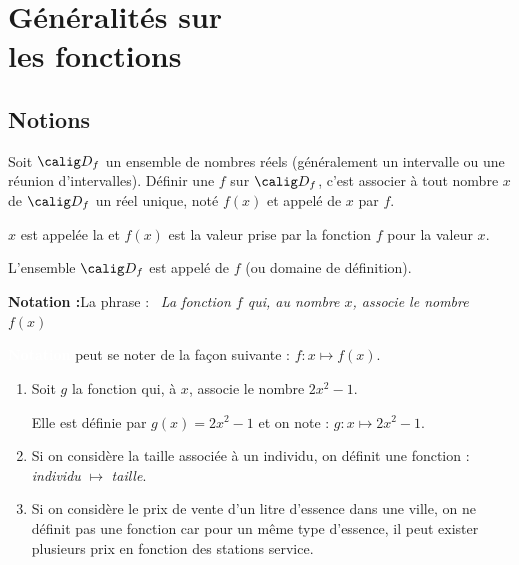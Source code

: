 \documentclass[10pt,openright,twoside,french]{book}
\begin{document}
\setcounter{chapter}{2}
\renewcommand\PartProgramme{Fonctions}
\chapter[Généralités sur les fonctions]{Généralités sur\\ les fonctions}\label{ch_gen_fonctions}

\section{Notions}

\begin{Defi}
    Soit $\calig D_f$ un ensemble de nombres réels (généralement un intervalle ou une réunion d'intervalles).
    Définir une  $f$ sur $\calig D_f$, c'est associer à tout nombre $x$ de $\calig D_f$ un réel unique, noté $f(x)$ et appelé  de $x$ par $f$.\par
    $x$ est appelée la  et $f(x)$ est la valeur prise par la fonction $f$ pour la valeur $x$.\par
    L'ensemble $\calig D_f$ est appelé  de $f$ (ou domaine de définition).
\end{Defi}\medskip

\textbf{Notation :}\quad La phrase : \textit{\og~La fonction $f$ qui, au nombre $x$, associe le nombre $f(x)$~\fg}\par
\textcolor{white}{\textbf{Notation }\quad} peut se noter de la façon suivante : $f : x \mapsto f(x)$.\medskip

\begin{Exemple}[s]
    \begin{enumerate}
        \item Soit $g$ la fonction qui, à $x$, associe le nombre $2x^2 - 1$.\par Elle est définie par $g(x) = 2x^2 -1$ et on note : $g : x \mapsto 2x^2 - 1.$
        \item Si on considère la taille associée à un individu, on définit une fonction : \textit{individu} $\mapsto$ \textit{taille}.
        \item	Si on considère le prix de vente d'un litre d'essence dans une ville, on ne définit pas une fonction car pour un même type d'essence, il peut exister plusieurs prix en fonction des stations service.
    \end{enumerate}
\end{Exemple}\medskip
\end{document}
